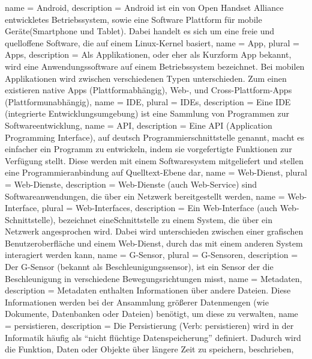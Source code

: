 \printglossaries
{}
{
  name = Android,
  description = {Android ist ein von Open Handset Alliance entwickletes Betriebssystem, sowie eine Software Plattform für mobile Geräte(\gls{Smartphone} und \gls{Tablet}). Dabei handelt es sich um eine freie und quelloffene Software, die auf einem Linux-Kernel basiert},
}
{
  name = App,
  plural = Apps,
  description = {Als Applikationen, oder eher als Kurzform App bekannt, wird eine Anwendungssoftware auf einem Betriebssystem bezeichnet. Bei mobilen Applikationen wird zwischen verschiedenen Typen unterschieden. Zum einen existieren native Apps (Plattformabhängig), Web-, und Cross-Plattform-Apps (Plattformunabhängig)},
}
{
	name = IDE,
	plural = IDEs,
	description = {Eine IDE (integrierte Entwicklungsumgebung) ist eine Sammlung von Programmen zur Softwareentwicklung},
}
{
  name = API,
  description = {Eine API (Application Programming Interface), auf deutsch Programmierschnittstelle genannt, macht es einfacher ein Programm zu entwickeln, indem sie vorgefertigte Funktionen zur Verfügung stellt. Diese werden mit einem Softwaresystem mitgeliefert und stellen eine Programmieranbindung auf Quelltext-Ebene dar},
}
{
  name = Web-Dienst,
  plural = Web-Dienste,
  description = {Web-Dienste (auch Web-Service) sind Softwareanwendungen, die über ein Netzwerk bereitgestellt werden},
}
{
  name = Web-Interface,
  plural = Web-Interfaces,
  description = {Ein Web-Interface (auch Web-Schnittstelle), bezeichnet eine\linebreak Schnittstelle zu einem System, die über ein Netzwerk angesprochen wird. Dabei wird unterschieden zwischen einer grafischen Benutzeroberfläche und einem \gls{Web-Dienst}, durch das mit einem anderen System interagiert werden kann},
}
{
  name = G-Sensor,
  plural = G-Sensoren,
  description = {Der G-Sensor (bekannt als Beschleunigungssensor), ist ein Sensor der die Beschleunigung in verschiedene Bewegungsrichtungen misst},
}
{
  name = Metadaten,
  description = {Metadaten enthalten Informationen über andere Dateien. Diese Informationen werden bei der Ansammlung größerer Datenmengen (wie Dokumente, Datenbanken oder Dateien) benötigt, um diese zu verwalten},
}
{
  name = persistieren,
  description = {Die Persistierung (Verb: persistieren) wird in der Informatik häufig als ``nicht flüchtige Datenspeicherung'' definiert. Dadurch wird die Funktion, Daten oder Objekte über längere Zeit zu speichern, beschrieben},
}
